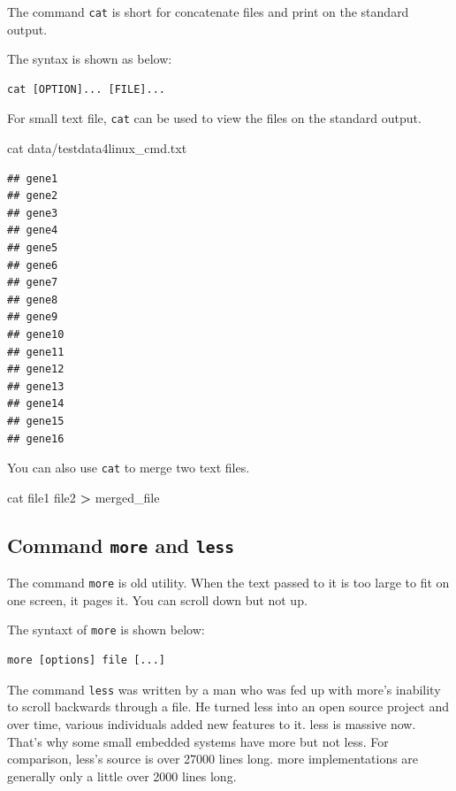 \documentclass[]{book}
\makeatletter
\newenvironment{Shaded}{\begin{snugshade}}{\end{snugshade}}
\newcommand{\FunctionTok}[1]{\textcolor[rgb]{0.00,0.00,0.00}{#1}}
\newcommand{\NormalTok}[1]{#1}
\newcommand{\OperatorTok}[1]{\textcolor[rgb]{0.81,0.36,0.00}{\textbf{#1}}}
\newenvironment{kframe}{%
\medskip{}
\setlength{\fboxsep}{.8em}
 \def\at@end@of@kframe{}%
 \ifinner\ifhmode%
  \def\at@end@of@kframe{\end{minipage}}%
  \begin{minipage}{\columnwidth}%
 \fi\fi%
 \def\FrameCommand##1{\hskip\@totalleftmargin \hskip-\fboxsep
 \colorbox{shadecolor}{##1}\hskip-\fboxsep
     \hskip-\linewidth \hskip-\@totalleftmargin \hskip\columnwidth}%
 \MakeFramed {\advance\hsize-\width
   \@totalleftmargin\z@ \linewidth\hsize
   \@setminipage}}%
 {\par\unskip\endMakeFramed%
 \at@end@of@kframe}
\renewenvironment{Shaded}{\begin{kframe}}{\end{kframe}}
\makeatother
\begin{document}
The command \texttt{cat} is short for concatenate files and print on the standard output.

The syntax is shown as below:

\begin{verbatim}
cat [OPTION]... [FILE]...
\end{verbatim}

For small text file, \texttt{cat} can be used to view the files on the standard output.

\begin{Shaded}
\begin{Highlighting}[]
\FunctionTok{cat}\NormalTok{ data/testdata4linux_cmd.txt}
\end{Highlighting}
\end{Shaded}

\begin{verbatim}
## gene1
## gene2
## gene3
## gene4
## gene5
## gene6
## gene7
## gene8
## gene9
## gene10
## gene11
## gene12
## gene13
## gene14
## gene15
## gene16
\end{verbatim}

You can also use \texttt{cat} to merge two text files.

\begin{Shaded}
\begin{Highlighting}[]
\FunctionTok{cat}\NormalTok{ file1 file2 }\OperatorTok{>}\NormalTok{ merged_file}
\end{Highlighting}
\end{Shaded}

\hypertarget{command-more-and-less}{%
\subsection{\texorpdfstring{Command \texttt{more} and \texttt{less}}{Command more and less}}\label{command-more-and-less}}

The command \texttt{more} is old utility. When the text passed to it is too large to fit on one screen, it pages it. You can scroll down but not up.

The syntaxt of \texttt{more} is shown below:

\begin{verbatim}
more [options] file [...]
\end{verbatim}

The command \texttt{less} was written by a man who was fed up with more's inability to scroll backwards through a file. He turned less into an open source project and over time, various individuals added new features to it. less is massive now. That's why some small embedded systems have more but not less. For comparison, less's source is over 27000 lines long. more implementations are generally only a little over 2000 lines long.
\end{document}
